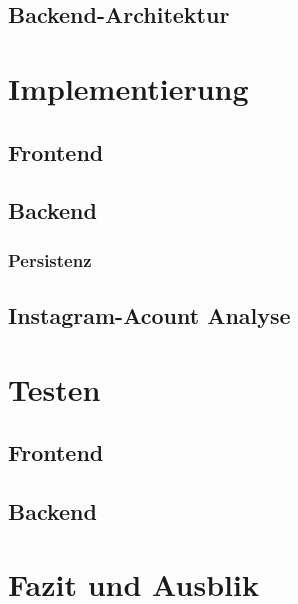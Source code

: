 \documentclass[conference,a4paper,flushend]{cs-techrep}
\begin{document}
\subsection{Backend-Architektur}


\section{Implementierung}
\subsection{Frontend}

\subsection{Backend}

\subsubsection{Persistenz}

\subsection{Instagram-Acount Analyse}




\section{Testen}

\subsection{Frontend}

\subsection{Backend}



\section{Fazit und Ausblik}



\end{document}
